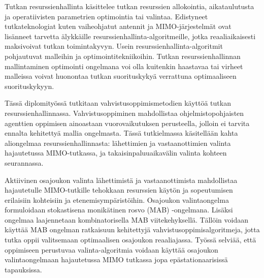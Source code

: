 \documentclass[english, 12pt, a4paper, elec, utf8, a-1b, online]{aaltothesis}
\begin{document}
\newpage
\begin{abstractpage}[finnish]
Tutkan resurssienhallinta käsittelee tutkan resurssien allokointia, aikataulutusta ja operatiivisten parametrien optimointia tai valintaa. 
Edistyneet tutkateknologiat kuten vaiheohjatut antennit ja MIMO-järjestelmät ovat lisänneet tarvetta älykkäille resurssienhallinta-algoritmeille, jotka reaaliaikaisesti maksivoivat tutkan toimintakyvyn. 
Usein resurssienhallinta-algoritmit pohjautuvat malleihin ja optimointitekniikoihin. Tutkan resurssienhallinnan mallintaminen optimointi ongelmana voi olla kuitenkin haastavaa tai virheet malleissa voivat huonontaa tutkan suorituskykyä verrattuna optimaaliseen suorituskykyyn.

Tässä diplomityössä tutkitaan vahvistusoppimismetodien käyttöä tutkan resurssienhallinnassa. Vahvistusoppiminen mahdollistaa ohjelmistopohjaisten agenttien oppimisen ainoastaan vuorovaikutuksen perusteella, jolloin ei tarvita ennalta kehitettyä mallia ongelmasta.
Tässä tutkielmassa käsitellään kahta aliongelmaa resurssienhallinnasta: lähettimien ja vastaanottimien valinta hajautetussa MIMO-tutkassa, ja takaisinpaluuaikavälin valinta kohteen seurannassa.

Aktiivinen osajoukon valinta lähettimistä ja vastaanottimista mahdollistaa hajautetulle MIMO-tutkille tehokkaan resurssien käytön ja sopeutumisen erilaisiin kohteisiin ja etenemisympäristöihin. Osajoukon valintaongelma formuloidaan stokastisena monikätinen rosvo (MAB) -ongelmana. Lisäksi ongelmaa laajennetaan kombinatorisella MAB viitekehyksellä. Tällöin voidaan käyttää MAB ongelman ratkaisuun kehitettyjä vahvistusoppimisalgoritmeja, jotta tutka oppii valitsemaan optimaalisen osajoukon reaaliajassa. Työssä selviää, että oppimiseen perustuvaa valinta-algoritmia voidaan käyttää osajoukon valintaongelmaan hajautetussa MIMO tutkassa jopa epästationaarisissä tapauksissa.


\end{abstractpage}
\end{document}
